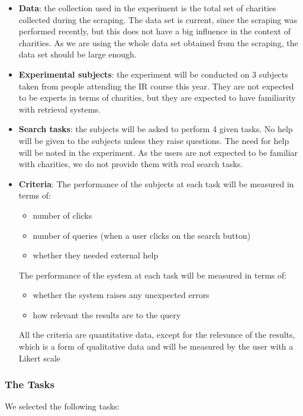 \documentclass[unicode,9pt,a4paper,oneside,numbers=endperiod,openany]{scrartcl}
\begin{document}
\begin{itemize}
    \item \textbf{Data}: the collection used in the experiment is the total set of charities collected during the scraping.
    The data set is current, since the scraping was performed recently, but this does not have a big influence in the context of charities.
    As we are using the whole data set obtained from the scraping, the data set should be large enough.
    \item \textbf{Experimental subjects}: the experiment will be conducted on 3 subjects taken from people attending the IR course this year. They are not expected to be experts in terms of charities, but they are expected to have familiarity with retrieval systems.
    \item \textbf{Search tasks}: the subjects will be asked to perform 4 given tasks. No help will be given to the subjects unless they raise questions. The need for help will be noted in the experiment. As the users are not expected to be familiar with charities, we do not provide them with real search tasks.
    \item \textbf{Criteria}: The performance of the subjects at each task will be measured in terms of:
    \begin{itemize}
        \item number of clicks
        \item number of queries (when a user clicks on the search button)
        \item whether they needed external help
    \end{itemize}
    The performance of the system at each task will be measured in terms of:
    \begin{itemize}
        \item whether the system raises any unexpected errors
        \item how relevant the results are to the query
    \end{itemize}
    All the criteria are quantitative data, except for the relevance of the results, which is a form of qualitative data and will be measured by the user with a Likert scale
\end{itemize}

\subsubsection{The Tasks}

We selected the following tasks:
\newline
\end{document}
